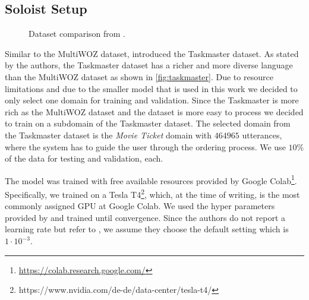 \documentclass[twocolumn]{tum-article}
\begin{document}
\subsection{Soloist Setup}\label{sec:soloist_setup}
\begin{figure}[!h]
\centering
{}
\caption{Dataset comparison from \cite{byrne2019taskmaster}.}
\label{fig:taskmaster}
\end{figure}
Similar to the MultiWOZ dataset, \cite{byrne2019taskmaster} introduced the Taskmaster dataset. As stated by the authors, the Taskmaster dataset has a richer and more diverse language than the MultiWOZ dataset as shown in \autoref{fig:taskmaster}. Due to resource limitations and due to the smaller model that is used in this work we decided to only select one domain for training and validation. Since the Taskmaster is more rich as the MultiWOZ dataset and the dataset is more easy to process we decided to train on a subdomain of the Taskmaster dataset. The selected domain from the Taskmaster dataset is the \textit{Movie Ticket} domain with $464965$ utterances, where the system has to guide the user through the ordering process. We use $10\%$ of the data for testing and validation, each. 

The model was trained with free available resources provided by Google Colab\footnote{\url{https://colab.research.google.com/}}. Specifically, we trained on a Tesla T4\footnote{https://www.nvidia.com/de-de/data-center/tesla-t4/}, which, at the time of writing, is the most commonly assigned GPU at Google Colab. We used the hyper parameters provided by \cite{peng2020soloist} and trained until convergence. Since the authors do not report a learning rate but refer to \cite{kingma2014adam}, we assume they choose the default setting which is $1\cdot 10^{-3}$. 
\end{document}

